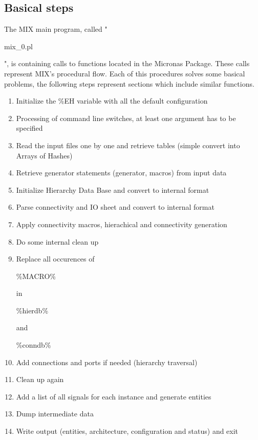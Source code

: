 \documentclass[a4paper,12pt]{article}
\begin{document}
\subsection{Basical steps}
The MIX main program, called "\begin{tt}mix\_0.pl\end{tt}", is containing calls to functions located in the Micronas Package. These calls represent MIX's procedural flow. Each of this procedures solves some basical problems, the following steps represent sections which include similar functions.
\begin{enumerate}
\item{Initialize the \%EH variable with all the default configuration}
\item{Processing of command line switches, at least one argument has to be specified}
\item{Read the input files one by one and retrieve tables (simple convert into Arrays of Hashes)}
\item{Retrieve generator statements (generator, macros) from input data}
\item{Initialize Hierarchy Data Base and convert to internal format}
\item{Parse connectivity and IO sheet and convert to internal format}
\item{Apply connectivity macros, hierachical and connectivity generation}
\item{Do some internal clean up}
\item{Replace all occurences of \begin{tt}\%MACRO\%\end{tt} in \begin{tt}\%hierdb\%\end{tt} and \begin{tt}\%conndb\%\end{tt}}
\item{Add connections and ports if needed (hierarchy traversal)}
\item{Clean up again}
\item{Add a list of all signals for each instance and generate entities}
\item{Dump intermediate data}
\item{Write output (entities, architecture, configuration and status) and exit}
\end{enumerate}
\end{document}
